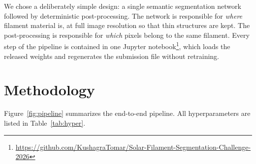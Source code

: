 \documentclass[sigconf]{acmart}
\begin{document}
    We chose a deliberately simple design: a single semantic segmentation network followed by deterministic post-processing. The network is responsible for \emph{where} filament material is, at full image resolution so that thin structures are kept. The post-processing is responsible for \emph{which} pixels belong to the same filament. Every step of the pipeline is contained in one Jupyter notebook\footnote{\url{https://github.com/KushagraTomar/Solar-Filament-Segmentation-Challenge-2026}}, which loads the released weights and regenerates the submission file without retraining.


\section{Methodology}\label{sec:methodology}
    Figure~\ref{fig:pipeline} summarizes the end-to-end pipeline. All hyperparameters are listed in Table~\ref{tab:hyper}.
\end{document}
